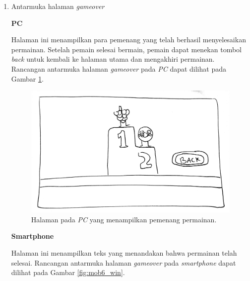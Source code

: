 \begin{enumerate}
\item Antarmuka halaman \textit{gameover}

	\textbf{PC}
	
	Halaman ini menampilkan para pemenang yang telah berhasil menyelesaikan permainan. Setelah pemain selesai bermain, pemain dapat menekan tombol \textit{back} untuk kembali ke halaman utama dan mengakhiri permainan. Rancangan antarmuka halaman \textit{gameover} pada \textit{PC} dapat dilihat pada Gambar \ref{fig:web6_winning}.
	
\begin{figure}[H]
	\centering
	\includegraphics[scale=0.1]{Gambar/web6_winning}
	\caption{Halaman pada \textit{PC} yang menampilkan pemenang permainan.}
	\label{fig:web6_winning}
\end{figure}

	\textbf{Smartphone}
	
	Halaman ini menampilkan teks yang menandakan bahwa permainan telah selesai. Rancangan antarmuka halaman \textit{gameover} pada \textit{smartphone} dapat dilihat pada Gambar \ref{fig:mob6_win}.
	

\end{enumerate}

